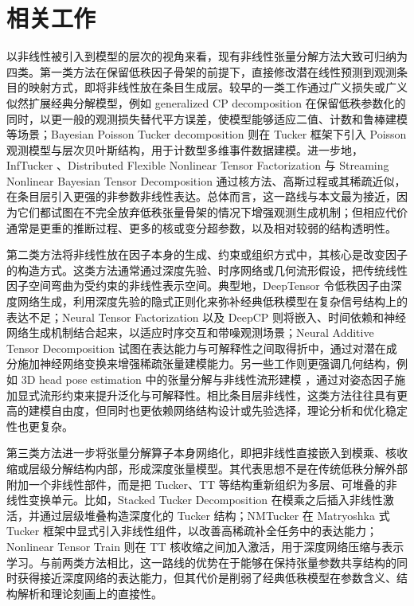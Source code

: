 \section{相关工作}

以非线性被引入到模型的层次的视角来看，现有非线性张量分解方法大致可归纳为四类。第一类方法在保留低秩因子骨架的前提下，直接修改潜在线性预测到观测条目的映射方式，即将非线性放在条目生成层。较早的一类工作通过广义损失或广义似然扩展经典分解模型，例如 generalized CP decomposition \cite{hong2020generalized} 在保留低秩参数化的同时，以更一般的观测损失替代平方误差，使模型能够适应二值、计数和鲁棒建模等场景；Bayesian Poisson Tucker decomposition \cite{schein2016bayesian} 则在 Tucker 框架下引入 Poisson 观测模型与层次贝叶斯结构，用于计数型多维事件数据建模。进一步地，InfTucker \cite{xu2011infinite}、Distributed Flexible Nonlinear Tensor Factorization \cite{zhe2016distributed} 与 Streaming Nonlinear Bayesian Tensor Decomposition \cite{pan2020streaming} 通过核方法、高斯过程或其稀疏近似，在条目层引入更强的非参数非线性表达。总体而言，这一路线与本文最为接近，因为它们都试图在不完全放弃低秩张量骨架的情况下增强观测生成机制；但相应代价通常是更重的推断过程、更多的核或变分超参数，以及相对较弱的结构透明性。

第二类方法将非线性放在因子本身的生成、约束或组织方式中，其核心是改变因子的构造方式。这类方法通常通过深度先验、时序网络或几何流形假设，把传统线性因子空间弯曲为受约束的非线性表示空间。典型地，DeepTensor \cite{saragadam2024deeptensor} 令低秩因子由深度网络生成，利用深度先验的隐式正则化来弥补经典低秩模型在复杂信号结构上的表达不足；Neural Tensor Factorization \cite{wu2019neural} 以及 DeepCP \cite{liu2017deepcp} 则将嵌入、时间依赖和神经网络生成机制结合起来，以适应时序交互和带噪观测场景；Neural Additive Tensor Decomposition \cite{ahn2024neural} 试图在表达能力与可解释性之间取得折中，通过对潜在成分施加神经网络变换来增强稀疏张量建模能力。另一些工作则更强调几何结构，例如 3D head pose estimation 中的张量分解与非线性流形建模 \cite{derkach2019tensor}，通过对姿态因子施加显式流形约束来提升泛化与可解释性。相比条目层非线性，这类方法往往具有更高的建模自由度，但同时也更依赖网络结构设计或先验选择，理论分析和优化稳定性也更复杂。

第三类方法进一步将张量分解算子本身网络化，即把非线性直接嵌入到模乘、核收缩或层级分解结构内部，形成深度张量模型。其代表思想不是在传统低秩分解外部附加一个非线性部件，而是把 Tucker、TT 等结构重新组织为多层、可堆叠的非线性变换单元。比如，Stacked Tucker Decomposition \cite{xu2024stacked} 在模乘之后插入非线性激活，并通过层级堆叠构造深度化的 Tucker 结构；NMTucker \cite{varolgunes2023nmtucker} 在 Matryoshka 式 Tucker 框架中显式引入非线性组件，以改善高稀疏补全任务中的表达能力；Nonlinear Tensor Train \cite{wang2021nonlinear} 则在 TT 核收缩之间加入激活，用于深度网络压缩与表示学习。与前两类方法相比，这一路线的优势在于能够在保持张量参数共享结构的同时获得接近深度网络的表达能力，但其代价是削弱了经典低秩模型在参数含义、结构解析和理论刻画上的直接性。

